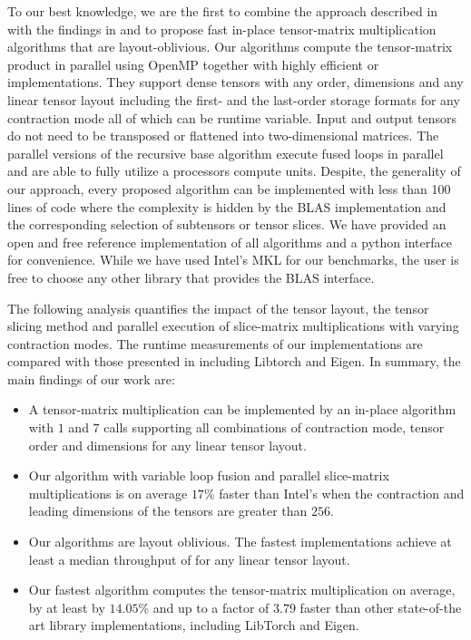 To our best knowledge, we are the first to combine the approach described in \cite{bassoy:2019:ttv} with the findings in \cite{li:2015:input} and to propose fast in-place tensor-matrix multiplication algorithms that are layout-oblivious.
Our algorithms compute the tensor-matrix product in parallel using OpenMP together with highly efficient  or  implementations.
They support dense tensors with any order, dimensions and any linear tensor layout including the first- and the last-order storage formats for any contraction mode all of which can be runtime variable.
Input and output tensors do not need to be transposed or flattened into two-dimensional matrices.
The parallel versions of the recursive base algorithm execute fused loops in parallel and are able to fully utilize a processors compute units.
Despite, the generality of our approach, every proposed algorithm can be implemented with less than 100 lines of  code where the complexity is hidden by the BLAS implementation and the corresponding selection of subtensors or tensor slices.
We have provided an open and free reference  implementation of all algorithms and a python interface for convenience.
While we have used Intel's MKL for our benchmarks, the user is free to choose any other library that provides the BLAS interface.

The following analysis quantifies the impact of the tensor layout, the tensor slicing method and parallel execution of slice-matrix multiplications with varying contraction modes.
The runtime measurements of our implementations are compared with those presented in \cite{springer:2018:design, matthews:2018:high} including Libtorch and Eigen.
In summary, the main findings of our work are:
\begin{itemize}
	\item 
	A tensor-matrix multiplication can be implemented by an in-place algorithm with $1$  and $7$  calls supporting all combinations of contraction mode, tensor order and dimensions for any linear tensor layout.
	\item 
	Our algorithm with variable loop fusion and parallel slice-matrix multiplications is on average $17$\% faster than Intel's  when the contraction and leading dimensions of the tensors are greater than $256$.
	\item 
	Our algorithms are layout oblivious.
	The fastest implementations achieve at least a median throughput of \tq for any linear tensor layout.
	\item
	Our fastest algorithm computes the tensor-matrix multiplication on average, by at least by $14.05$\% and up to a factor of $3.79$ faster than other state-of-the art library implementations, including LibTorch and Eigen.
\end{itemize}

